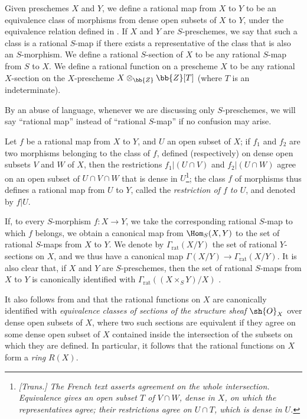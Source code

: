 \begin{definition}[7.1.2]
\label{I.7.1.2}
Given preschemes $X$ and $Y$, we define a rational map from $X$ to $Y$ to be an equivalence class of morphisms from dense open subsets of $X$ to $Y$, under the equivalence relation defined in .
If $X$ and $Y$ are $S$-preschemes, we say that such a class is a rational $S$-map if there exists a representative of the class that is also an $S$-morphism.
We define a rational $S$-section of $X$ to be any rational $S$-map from $S$ to $X$.
We define a rational function on a prescheme $X$ to be any rational $X$-section on the $X$-prescheme $X\otimes_{\bb{Z}}\bb{Z}[T]$ (where $T$ is an indeterminate).

By an abuse of language, whenever we are discussing only $S$-preschemes, we will say ``rational map'' instead of ``rational $S$-map'' if no confusion may arise.

Let $f$ be a rational map from $X$ to $Y$, and $U$ an open subset of $X$; if $f_1$ and $f_2$ are two morphisms belonging to the class of $f$, defined (respectively) on dense open subsets $V$ and $W$ of $X$, then the restrictions $f_1|(U\cap V)$ and $f_2|(U\cap W)$ agree on an open subset of $U\cap V\cap W$ that is dense in $U$\footnote{\emph{[Trans.] The French text asserts agreement on the whole intersection. Equivalence gives an open subset $T$ of $V\cap W$, dense in $X$, on which the representatives agree; their restrictions agree on $U\cap T$, which is dense in $U$.}}; the class $f$ of morphisms thus defines a rational map from $U$ to $Y$, called the \emph{restriction of $f$ to $U$}, and denoted by $f|U$.

If, to every $S$-morphism $f:X\to Y$, we take the corresponding rational $S$-map
to which $f$ belongs, we obtain a canonical map from $\Hom_S(X,Y)$ to the set of rational $S$-maps from $X$ to $Y$.
We denote by $\Gamma_\mathrm{rat}(X/Y)$ the set of rational $Y$-sections on $X$, and we thus have a canonical map $\Gamma(X/Y)\to\Gamma_\mathrm{rat}(X/Y)$.
It is also clear that, if $X$ and $Y$ are $S$-preschemes, then the set of rational $S$-maps from $X$ to $Y$ is canonically identified with $\Gamma_\mathrm{rat}((X\times_S Y)/X)$ .
\end{definition}

\begin{env}[7.1.3]
\label{I.7.1.3}
It also follows from  and  that the rational functions on $X$ are canonically identified with \emph{equivalence classes of sections of the structure sheaf $\sh{O}_X$} over dense open subsets of $X$, where two such sections are equivalent if they agree on some dense open subset of $X$ contained inside the intersection of the subsets on which they are defined.
In particular, it follows that the rational functions on $X$ form a \emph{ring} $R(X)$.
\end{env}

